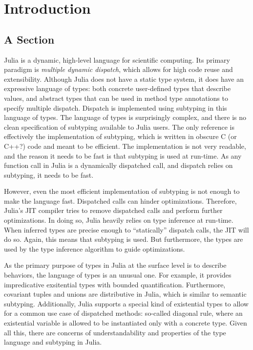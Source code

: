 \chapter{Introduction}

\section{A Section}


Julia is a dynamic, high-level language for scientific computing.
Its primary paradigm is \emph{multiple dynamic dispatch}, which allows for
high code reuse and extensibility. Although Julia does not have a static type
system, it does have an expressive language of types: both concrete user-defined
types that describe values, and abstract types that can be used in method type
annotations to specify multiple dispatch. Dispatch is implemented using
subtyping in this language of types.
The language of types is surprisingly complex, and there is no clean
specification of subtyping available to Julia users. The only reference is
effectively the implementation of subtyping, which is written in obscure C (or
C++?) code and meant to be efficient. The implementation is not very readable,
and the reason it needs to be fast is that subtyping is used at run-time.
As any function call in Julia is a dynamically dispatched call, and dispatch
relies on subtyping, it needs to be fast.

However, even the most efficient implementation of subtyping is not enough to
make the language fast. Dispatched calls can hinder optimizations. Therefore,
Julia's JIT compiler tries to remove dispatched calls and perform further
optimizations. In doing so, Julia heavily relies on type inference at run-time.
When inferred types are precise enough to ``statically'' dispatch calls, the JIT
will do so. Again, this means that subtyping is used. But furthermore, the types
are used by the type inference algorithm to guide optimizations.

As the primary purpose of types in Julia at the surface level is to describe
behaviors, the language of types is an unusual one. For example, it provides
impredicative exsitential types with bounded quantification. Furthermore,
covariant tuples and unions are distributive in Julia, which is similar to
semantic subtyping. Additionally, Julia supports a special kind of existential
types to allow for a common use case of dispatched methods: so-called diagonal
rule, where an existential variable is allowed to be instantiated only with a
concrete type. Given all this, there are concerns of understandability and
properties of the type language and subtyping in Julia.

